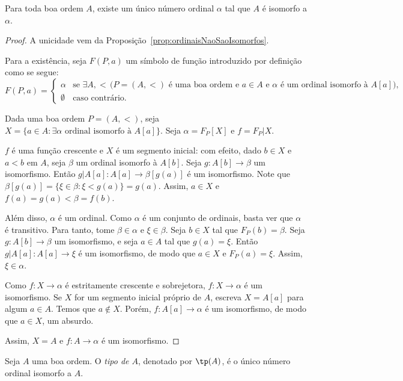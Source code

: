 \begin{theorem}[$\ZFmPI$]\label{thm:boaOrdemEhIsomorfaAOrdinal}
    Para toda boa ordem $A$, existe um único número ordinal $\alpha$ tal que $A$ é isomorfo a $\alpha$.
\end{theorem}
\begin{proof}
    A unicidade vem da Proposição~\ref{prop:ordinaisNaoSaoIsomorfos}.
    
    Para a existência, seja $F(P, a)$ um símbolo de função introduzido por definição como se segue:
    \[
        F(P, a)=\begin{cases}
        \alpha & \text{se } \exists A, <\,\Big(P=(A, <) \text{ é uma boa ordem e } a\in A \text{ e } \alpha \text{ é um ordinal isomorfo à } A[a]\Big),\\
        \emptyset & \text{caso contrário.}
        \end{cases}
    \]

    Dada uma boa ordem $P=(A, <)$, seja $X=\{a \in A : \exists \alpha \text{ ordinal isomorfo à } A[a]\}$.
    Seja $\alpha=F_P[X]$ e $f=F_P|X$.

    $f$ é uma função crescente e $X$ é um segmento inicial:
    com efeito, dado $b \in X$ e $a<b$ em $A$, seja $\beta$ um ordinal isomorfo à $A[b]$.
    Seja $g: A[b]\to \beta$ um isomorfismo.
    Então $g|A[a]: A[a]\to \beta[g(a)]$ é um isomorfismo.
    Note que $\beta[g(a)]=\{\xi \in \beta: \xi<g(a)\}=g(a)$.
    Assim, $a\in X$ e $f(a)=g(a)<\beta=f(b)$.

    Além disso, $\alpha$ é um ordinal.
    Como $\alpha$ é um conjunto de ordinais, basta ver que $\alpha$ é transitivo.
    Para tanto, tome $\beta\in \alpha$ e $\xi\in \beta$.
    Seja $b\in X$ tal que $F_P(b)=\beta$.
    Seja $g: A[b]\to \beta$ um isomorfismo, e seja $a\in A$ tal que $g(a)=\xi$.
    Então $g|A[a]: A[a]\to \xi$ é um isomorfismo, de modo que $a\in X$ e $F_P(a)=\xi$.
    Assim, $\xi\in \alpha$.

    Como $f: X\to \alpha$ é estritamente crescente e sobrejetora, $f: X\to \alpha$ é um isomorfismo.
    Se $X$ for um segmento inicial próprio de $A$, escreva $X=A[a]$ para algum $a\in A$.
    Temos que $a \notin X$.
    Porém, $f:A[a]\to \alpha$ é um isomorfismo, de modo que $a \in X$, um absurdo.

    Assim, $X=A$ e $f: A\to \alpha$ é um isomorfismo.
\end{proof}

\begin{definition}[$\ZFmPI$]\label{def:tipoDeBoaOrdem}
Seja $A$ uma boa ordem.
O \emph{tipo de $A$}, denotado por $\tp(A)$, é o único número ordinal isomorfo a $A$.
\end{definition}

